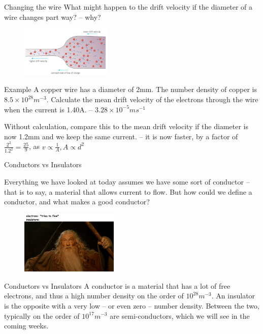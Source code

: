 \documentclass[../Main.tex]{subfiles}
\begin{document}
\begin{frame}{Changing the wire}
    What might happen to the drift velocity if the diameter of a wire changes part way? -- why? 
    \pause
    \begin{figure}
        \centering
        \includegraphics[height=2.4cm]{Electricity_Images/changing_wire.png}
    \end{figure}
    
    \begin{exampleblock}{Example}
    A copper wire has a diameter of 2mm. The number density of copper is $8.5\times10^{28} m^{-3}$. Calculate the mean drift velocity of the electrons through the wire when the current is 1.40A. \pause
    -- $3.28\times 10^{-5}ms^{-1}$ \newline \pause
    
    Without calculation, compare this to the mean drift velocity if the diameter is now 1.2mm and we keep the same current. \pause
    -- it is now faster, by a factor of $\frac{2^2}{1.2^2}=\frac{25}{9}$, as $v\propto \frac{1}{A}, A\propto d^2$
    \end{exampleblock}
\end{frame}

\begin{frame}{Conductors vs Insulators}
\begin{multicols}{2}
    Everything we have looked at today assumes we have some sort of conductor -- that is to say, a material that allows current to flow. 
    \newline \newline
    But how could we define a conductor, and what makes a good conductor? 
    \pause
    \begin{figure}
        \centering
        \includegraphics[height=3cm]{Electricity_Images/you_shall_not_pass.png}
    \end{figure}
    \end{multicols}
    
    \begin{block}{Conductors vs Insulators}
    A conductor is a material that has a lot of free electrons, and thus a high number density on the order of $10^{28} m^{-3}$. An insulator is the opposite with a very low -- or even zero -- number density. Between the two, typically on the order of $10^{17} m^{-3}$ are semi-conductors, which we will see in the coming weeks.
    \end{block}
    
\end{frame}
\end{document}
